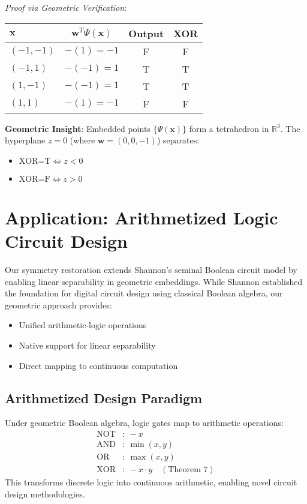 \documentclass{article}
\begin{document}
\textit{Proof via Geometric Verification}:
\begin{center}
\begin{tabular}{l|c|c|c}
$\mathbf{x}$ & $\mathbf{w}^T\Psi(\mathbf{x})$ & Output & XOR \\ \hline
$(-1,-1)$ & $-(1) = -1$ & F & F \\
$(-1,1)$ & $-(-1) = 1$ & T & T \\
$(1,-1)$ & $-(-1) = 1$ & T & T \\
$(1,1)$ & $-(1) = -1$ & F & F \\
\end{tabular}
\end{center}

\textbf{Geometric Insight}:
Embedded points $\{\Psi(\mathbf{x})\}$ form a tetrahedron in $\mathbb{R}^3$. The hyperplane $z=0$ (where $\mathbf{w} = (0,0,-1)$) separates:
\begin{itemize}
\item $\text{XOR=T} \iff z < 0$
\item $\text{XOR=F} \iff z > 0$
\end{itemize}


\section{Application: Arithmetized Logic Circuit Design}

Our symmetry restoration extends Shannon's seminal Boolean circuit model \cite{shannon1938symbolic} by enabling linear separability in geometric embeddings. While Shannon established the foundation for digital circuit design using classical Boolean algebra, our geometric approach provides:

\begin{itemize}
\item Unified arithmetic-logic operations
\item Native support for linear separability
\item Direct mapping to continuous computation
\end{itemize}

\subsection{Arithmetized Design Paradigm}
Under geometric Boolean algebra, logic gates map to arithmetic operations:
\begin{align}
\text{NOT} &:\ -x \\
\text{AND} &:\ \min(x,y) \\
\text{OR}  &:\ \max(x,y) \\
\text{XOR} &:\ -x \cdot y \quad (\text{Theorem 7})
\end{align}
This transforms discrete logic into continuous arithmetic, enabling novel circuit design methodologies.
\end{document}
